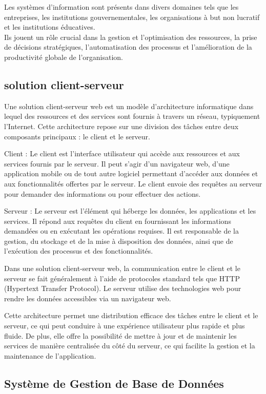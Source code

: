 Les systèmes d'information sont présents dans divers domaines tels que les entreprises, les institutions gouvernementales, les organisations à but non lucratif et les institutions éducatives.\\ Ils jouent un rôle crucial dans la gestion et l'optimisation des ressources, la prise de décisions stratégiques, l'automatisation des processus et l'amélioration de la productivité globale de l'organisation.
\subsection{solution client-serveur}
Une solution client-serveur web est un modèle d'architecture informatique dans lequel des ressources et des services sont fournis à travers un réseau, typiquement l'Internet. Cette architecture repose sur une division des tâches entre deux composants principaux : le client et le serveur.

    Client : Le client est l'interface utilisateur qui accède aux ressources et aux services fournis par le serveur. Il peut s'agir d'un navigateur web, d'une application mobile ou de tout autre logiciel permettant d'accéder aux données et aux fonctionnalités offertes par le serveur. Le client envoie des requêtes au serveur pour demander des informations ou pour effectuer des actions.

    Serveur : Le serveur est l'élément qui héberge les données, les applications et les services. Il répond aux requêtes du client en fournissant les informations demandées ou en exécutant les opérations requises. Il est responsable de la gestion, du stockage et de la mise à disposition des données, ainsi que de l'exécution des processus et des fonctionnalités.

Dans une solution client-serveur web, la communication entre le client et le serveur se fait généralement à l'aide de protocoles standard tels que HTTP (Hypertext Transfer Protocol). Le serveur utilise des technologies web pour rendre les données accessibles via un navigateur web.

Cette architecture permet une distribution efficace des tâches entre le client et le serveur, ce qui peut conduire à une expérience utilisateur plus rapide et plus fluide. De plus, elle offre la possibilité de mettre à jour et de maintenir les services de manière centralisée du côté du serveur, ce qui facilite la gestion et la maintenance de l'application.
\subsection{Système de Gestion de Base de Données}
